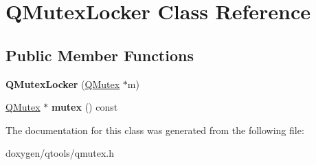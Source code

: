 \hypertarget{class_q_mutex_locker}{}\section{Q\+Mutex\+Locker Class Reference}
\label{class_q_mutex_locker}
\subsection*{Public Member Functions}
\begin{DoxyCompactItemize}
\item 
\mbox{\label{class_q_mutex_locker_a51d7d5d8c71151581498a41e6bbb02b3}} 
{\bfseries Q\+Mutex\+Locker} (\mbox{\hyperlink{class_q_mutex}{Q\+Mutex}} $\ast$m)
\item 
\mbox{\label{class_q_mutex_locker_a277438172453857bc7046da19e94b56b}} 
\mbox{\hyperlink{class_q_mutex}{Q\+Mutex}} $\ast$ {\bfseries mutex} () const
\end{DoxyCompactItemize}


The documentation for this class was generated from the following file\+:\begin{DoxyCompactItemize}
\item 
doxygen/qtools/qmutex.\+h\end{DoxyCompactItemize}
